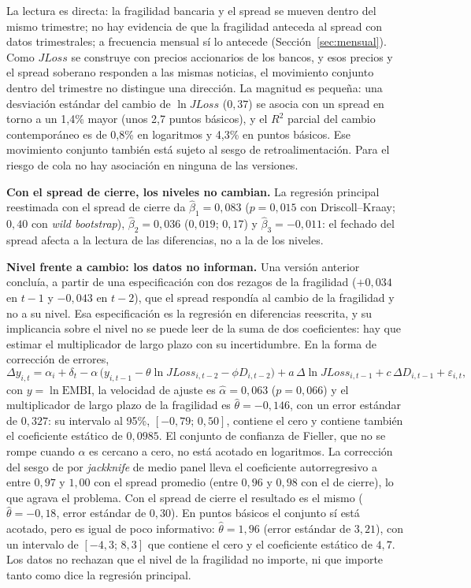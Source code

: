 La lectura es directa: la fragilidad bancaria y el spread se mueven dentro del mismo trimestre; no hay evidencia de que la fragilidad anteceda al spread con datos trimestrales; a frecuencia mensual sí lo antecede (Sección~\ref{sec:mensual}). Como $JLoss$ se construye con precios accionarios de los bancos, y esos precios y el spread soberano responden a las mismas noticias, el movimiento conjunto dentro del trimestre no distingue una dirección. La magnitud es pequeña: una desviación estándar del cambio de $\ln JLoss$ ($0{,}37$) se asocia con un spread en torno a un 1,4\% mayor (unos 2,7 puntos básicos), y el $R^2$ parcial del cambio contemporáneo es de 0,8\% en logaritmos y 4,3\% en puntos básicos. Ese movimiento conjunto también está sujeto al sesgo de retroalimentación. Para el riesgo de cola no hay asociación en ninguna de las versiones.

\textbf{Con el spread de cierre, los niveles no cambian.} La regresión principal reestimada con el spread de cierre da $\hat\beta_1=0{,}083$ ($p=0{,}015$ con Driscoll--Kraay; $0{,}40$ con \textit{wild bootstrap}), $\hat\beta_2=0{,}036$ ($0{,}019$; $0{,}17$) y $\hat\beta_3=-0{,}011$: el fechado del spread afecta a la lectura de las diferencias, no a la de los niveles.

\textbf{Nivel frente a cambio: los datos no informan.} Una versión anterior concluía, a partir de una especificación con dos rezagos de la fragilidad ($+0{,}034$ en $t-1$ y $-0{,}043$ en $t-2$), que el spread respondía al cambio de la fragilidad y no a su nivel. Esa especificación es la regresión en diferencias reescrita, y su implicancia sobre el nivel no se puede leer de la suma de dos coeficientes: hay que estimar el multiplicador de largo plazo con su incertidumbre. En la forma de corrección de errores,
\begin{equation}
\Delta y_{i,t}=\alpha_i+\delta_t-\alpha\,\bigl(y_{i,t-1}-\theta\ln JLoss_{i,t-2}-\phi D_{i,t-2}\bigr)+a\,\Delta\ln JLoss_{i,t-1}+c\,\Delta D_{i,t-1}+\varepsilon_{i,t},
\label{eq:ecm}
\end{equation}
con $y=\ln\mathrm{EMBI}$, la velocidad de ajuste es $\hat\alpha=0{,}063$ ($p=0{,}066$) y el multiplicador de largo plazo de la fragilidad es $\hat\theta=-0{,}146$, con un error estándar de $0{,}327$: su intervalo al 95\%, $[-0{,}79;\,0{,}50]$, contiene el cero y contiene también el coeficiente estático de $0{,}0985$. El conjunto de confianza de Fieller, que no se rompe cuando $\alpha$ es cercano a cero, no está acotado en logaritmos. La corrección del sesgo de \citet{Nickell1981} por \textit{jackknife} de medio panel lleva el coeficiente autorregresivo a entre $0{,}97$ y $1{,}00$ con el spread promedio (entre $0{,}96$ y $0{,}98$ con el de cierre), lo que agrava el problema. Con el spread de cierre el resultado es el mismo ($\hat\theta=-0{,}18$, error estándar de $0{,}30$). En puntos básicos el conjunto sí está acotado, pero es igual de poco informativo: $\hat\theta=1{,}96$ (error estándar de $3{,}21$), con un intervalo de $[-4{,}3;\,8{,}3]$ que contiene el cero y el coeficiente estático de $4{,}7$. Los datos no rechazan que el nivel de la fragilidad no importe, ni que importe tanto como dice la regresión principal.

